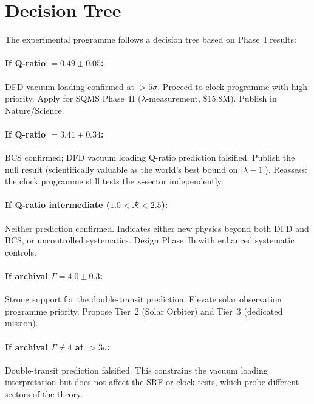 \documentclass[11pt]{article}
\newcommand{\lbone}{|\lambda - 1|}
\begin{document}
\section{Decision Tree}
\label{sec:decision-tree}

The experimental programme follows a decision tree based on
Phase~I results:

\paragraph{If Q-ratio $= 0.49 \pm 0.05$:}
DFD vacuum loading confirmed at $> 5\sigma$.  Proceed to clock
programme with high priority.  Apply for SQMS Phase~II
($\lambda$-measurement, \$15.8M).  Publish in Nature/Science.

\paragraph{If Q-ratio $= 3.41 \pm 0.34$:}
BCS confirmed; DFD vacuum loading Q-ratio prediction falsified.
Publish the null result (scientifically valuable as the world's
best bound on $\lbone$).  Reassess: the clock programme still
tests the $\kappa$-sector independently.

\paragraph{If Q-ratio intermediate ($1.0 < \mathcal{R} < 2.5$):}
Neither prediction confirmed.  Indicates either new physics beyond
both DFD and BCS, or uncontrolled systematics.  Design Phase~Ib
with enhanced systematic controls.

\paragraph{If archival $\Gamma = 4.0 \pm 0.3$:}
Strong support for the double-transit prediction.  Elevate solar
observation programme priority.  Propose Tier~2 (Solar Orbiter)
and Tier~3 (dedicated mission).

\paragraph{If archival $\Gamma \neq 4$ at $> 3\sigma$:}
Double-transit prediction falsified.  This constrains the vacuum
loading interpretation but does not affect the SRF or clock tests,
which probe different sectors of the theory.
\end{document}
